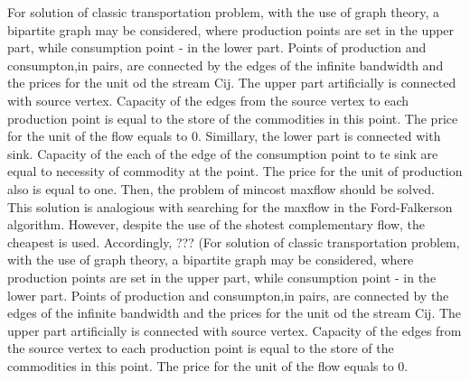 \documentclass[a4paper,11pt]{scrartcl}
\begin{document}
For solution of classic transportation problem, with the use of graph theory, a bipartite graph may be considered, where production points are set in the upper part, while consumption point - in the lower part.  Points of production and consumpton,in pairs, are connected by the edges of the infinite bandwidth and the prices for the unit od the stream Cij.
The upper part artificially is connected  with source vertex. Capacity of the edges from the source vertex to each production point is equal to the store of the commodities in this point. The price for the unit of the flow equals to 0. 
Simillary, the lower part is connected with sink. Capacity of the each of the edge of the consumption point to te sink are equal to necessity of commodity at the point. The price for the unit of production also is equal to one. 
Then, the problem of mincost maxflow should be solved. This solution is analogious with searching for the maxflow in the Ford-Falkerson algorithm. However, despite the use of the shotest complementary flow, the cheapest is used.  Accordingly, ??? (For solution of classic transportation problem, with the use of graph theory, a bipartite graph may be considered, where production points are set in the upper part, while consumption point - in the lower part.  Points of production and consumpton,in pairs, are connected by the edges of the infinite bandwidth and the prices for the unit od the stream Cij.
The upper part artificially is connected  with source vertex. Capacity of the edges from the source vertex to each production point is equal to the store of the commodities in this point. The price for the unit of the flow equals to 0. 
\end{document}
